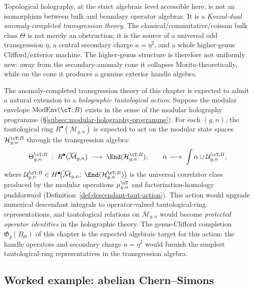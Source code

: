 Topological holography, at the strict algebraic level accessible here, is not an isomorphism between bulk and boundary operator algebras.
It is a \emph{Koszul-dual anomaly-completed transgression theory}.
The classical/commutative/coisson bulk class \(\Theta\) is not merely an obstruction; it is the source of a universal odd transgression \(\eta\), a central secondary charge \(u=\eta^{2}\), and a whole higher-genus Clifford/exterior machine.
The higher-genus structure is therefore not uniformly new:
away from the secondary-anomaly cone it collapses Morita-theoretically,
while on the cone it produces a genuine exterior handle algebra.

\providecommand{\ModEnv}{\operatorname{ModEnv}}
\providecommand{\Mbar}{\overline{\mathcal M}}
\providecommand{\Rring}{R^{\bullet}}

\begin{remark}
The anomaly-completed transgression theory of this chapter is expected to admit a
natural extension to a \emph{holographic tautological action}.
Suppose the modular envelope \(\ModEnv(\cT;B)\) exists in the sense of
the modular holography programme
(\S\ref{subsec:modular-holography-programme}).
For each \((g,n)\), the tautological ring
\(\Rring(\Mbar_{g,n})\) is expected to act on the modular state spaces
\(\mathcal{H}_{g,n}^{\cT;B}\) through the transgression algebra:
\[
\Theta_{g,n}^{\cT;B}
\;:\;
\Rring(\Mbar_{g,n})
\;\longrightarrow\;
\End(\mathcal{H}_{g,n}^{\cT;B}),
\qquad
\alpha\;\longmapsto\;
\int\alpha\cup\mathcal{U}_{g,n}^{\cT;B},
\]
where
\(\mathcal{U}_{g,n}^{\cT;B}
\in H^{\bullet}\!\bigl(\Mbar_{g,n};\;\End(\mathcal{H}_{g,n}^{\cT;B})\bigr)\)
is the universal correlator class produced by the modular operations
\(\mu_{g,n}^{\cT}\) and factorization-homology pushforward
(Definition~\ref{def:descendant-taut-action}).
This action would upgrade numerical descendant integrals to operator-valued
tautological-ring representations, and tautological relations on
\(\Mbar_{g,n}\) would become \emph{protected operator identities} in the
holographic theory.
The genus-Clifford completion \(\mathfrak{G}_{g}(B_{\Theta})\) of this
chapter is the expected algebraic target for this action: the handle
operators and secondary charge \(u=\eta^{2}\) would furnish the simplest
tautological-ring representatives in the transgression algebra.
\end{remark}

\subsection{Worked example: abelian Chern--Simons}


